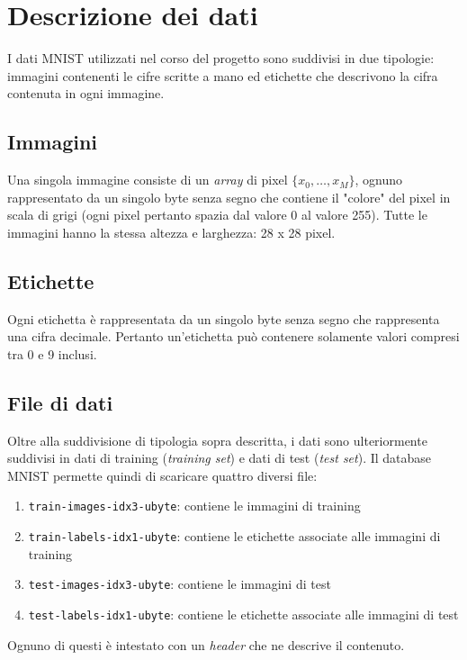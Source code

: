 
\section{Descrizione dei dati} \label{sec:data}
I dati MNIST utilizzati nel corso del progetto sono suddivisi in due tipologie: immagini contenenti le cifre scritte a mano ed etichette che descrivono la cifra contenuta in ogni immagine.

\subsection{Immagini}
Una singola immagine consiste di un {\it array} di pixel \(\{x_0, \dotsc, x_M\}\), ognuno rappresentato da un singolo byte senza segno che contiene il "colore" del pixel in scala di grigi (ogni pixel pertanto spazia dal valore 0 al valore 255). Tutte le immagini hanno la stessa altezza e larghezza: 28 x 28 pixel.

\subsection{Etichette}
Ogni etichetta \`e rappresentata da un singolo byte senza segno che rappresenta una cifra decimale. Pertanto un'etichetta pu\`o contenere solamente valori compresi tra 0 e 9 inclusi.

\subsection{File di dati}
 Oltre alla suddivisione di tipologia sopra descritta, i dati sono ulteriormente suddivisi in dati di training ({\it training set}) e dati di test ({\it test set}). 
 Il database MNIST permette quindi di scaricare quattro diversi file:
\begin{enumerate}
	\item {\tt train-images-idx3-ubyte}: contiene le immagini di training
	\item {\tt train-labels-idx1-ubyte}: contiene le etichette associate alle immagini di training
	\item {\tt test-images-idx3-ubyte}: contiene le immagini di test
	\item {\tt test-labels-idx1-ubyte}: contiene le etichette associate alle immagini di test
\end{enumerate}
Ognuno di questi \`e intestato con un {\it header} che ne descrive il contenuto.